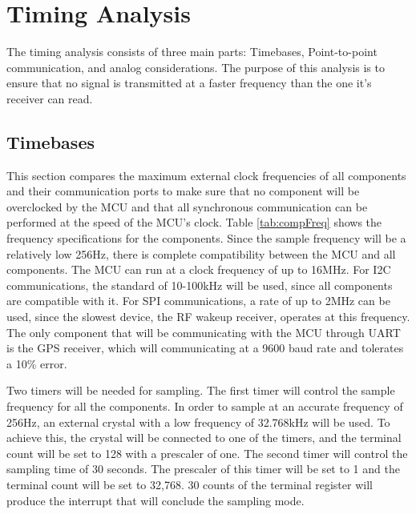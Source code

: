 \section{Timing Analysis}
The timing analysis consists of three main parts: Timebases, Point-to-point communication, and analog considerations. The purpose of this analysis is to ensure that no signal is transmitted at a faster frequency than the one it's receiver can read.

\subsection{Timebases}
This section compares the maximum external clock frequencies of all components and their communication ports to make sure that no component will be overclocked by the MCU and that all synchronous communication can be performed at the speed of the MCU's clock. Table \ref{tab:compFreq} shows the frequency specifications for the components.  Since the sample frequency will be a relatively low 256Hz, there is complete compatibility between the MCU and all components. The MCU can run at a clock frequency of up to 16MHz. For I2C communications, the standard of 10-100kHz will be used, since all components are compatible with it. For SPI communications, a rate of up to 2MHz can be used, since the slowest device, the RF wakeup receiver, operates at this frequency. The only component that will be communicating with the MCU through UART is the GPS receiver, which will communicating at a 9600 baud rate and tolerates a 10\% error.

Two timers will be needed for sampling. The first timer will control the sample frequency for all the components.  In order to sample at an accurate frequency of 256Hz, an external crystal with a low frequency of 32.768kHz will be used. To achieve this, the crystal will be connected to one of the timers, and the terminal count will be set to 128 with a prescaler of one. The second timer will control the sampling time of 30 seconds. The prescaler of this timer will be set to 1 and the terminal count will be set to 32,768. 30 counts of the terminal register will produce the interrupt that will conclude the sampling mode.

